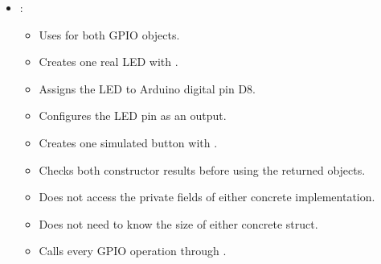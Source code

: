 \begin{itemize}
\begin{itemize}
    \item Extend the embedded interface with a .
    \item Define a separate  for the stub implementation.
    \item Assign the stub vtable during construction.
    \item Allocate one  object with .
    \item Initialize its logical state.
    \item Return  if allocation fails.
    \item Implement  by assigning the in-memory state.
    \item Implement  by returning the in-memory state.
    \item Implement  by inverting the state.
    \item Implement  by freeing the stub allocation and nulling the caller's pointer.
    \item Perform no hardware register access.
    \item Require no ATmega328P GPIO pin.
    \item Require no external wiring.
    \item Satisfy the same behavioral contract as the real GPIO implementation.
    \item Allow higher-level logic to be exercised in a deterministic software-only environment.
  \end{itemize}
  \item {}:
  \begin{itemize}
    \item Uses  for both GPIO objects.
    \item Creates one real LED with .
    \item Assigns the LED to Arduino digital pin D8.
    \item Configures the LED pin as an output.
    \item Creates one simulated button with .
    \item Checks both constructor results before using the returned objects.
    \item Does not access the private fields of either concrete implementation.
    \item Does not need to know the size of either concrete struct.
    \item Calls every GPIO operation through .

\end{itemize}
\end{itemize}
